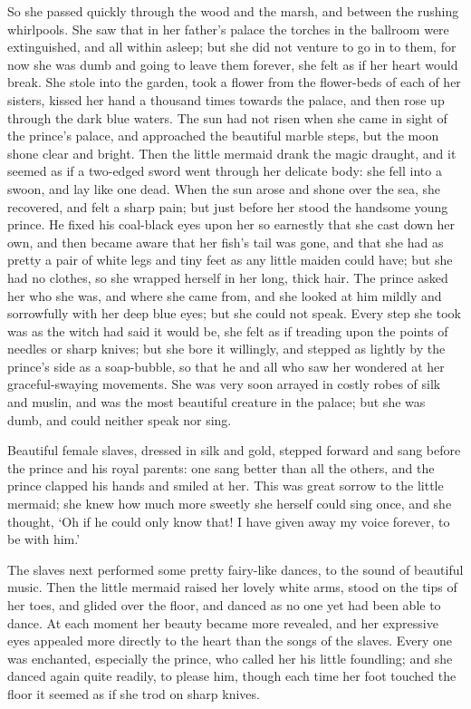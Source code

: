 So she passed quickly through the wood and the marsh, and between the rushing whirlpools.
She saw that in her father’s palace the torches in the ballroom were extinguished, and all within asleep; but she did not venture to go in to them, for now she was dumb and going to leave them forever, she felt as if her heart would break.
She stole into the garden, took a flower from the flower-beds of each of her sisters, kissed her hand a thousand times towards the palace, and then rose up through the dark blue waters.
The sun had not risen when she came in sight of the prince’s palace, and approached the beautiful marble steps, but the moon shone clear and bright.
Then the little mermaid drank the magic draught, and it seemed as if a two-edged sword went through her delicate body: she fell into a swoon, and lay like one dead.
When the sun arose and shone over the sea, she recovered, and felt a sharp pain; but just before her stood the handsome young prince.
He fixed his coal-black eyes upon her so earnestly that she cast down her own, and then became aware that her fish’s tail was gone, and that she had as pretty a pair of white legs and tiny feet as any little maiden could have; but she had no clothes, so she wrapped herself in her long, thick hair.
The prince asked her who she was, and where she came from, and she looked at him mildly and sorrowfully with her deep blue eyes; but she could not speak.
Every step she took was as the witch had said it would be, she felt as if treading upon the points of needles or sharp knives; but she bore it willingly, and stepped as lightly by the prince’s side as a soap-bubble, so that he and all who saw her wondered at her graceful-swaying movements.
She was very soon arrayed in costly robes of silk and muslin, and was the most beautiful creature in the palace; but she was dumb, and could neither speak nor sing.

Beautiful female slaves, dressed in silk and gold, stepped forward and sang before the prince and his royal parents: one sang better than all the others, and the prince clapped his hands and smiled at her.
This was great sorrow to the little mermaid; she knew how much more sweetly she herself could sing once, and she thought, `Oh if he could only know that! I have given away my voice forever, to be with him.'

The slaves next performed some pretty fairy-like dances, to the sound of beautiful music.
Then the little mermaid raised her lovely white arms, stood on the tips of her toes, and glided over the floor, and danced as no one yet had been able to dance.
At each moment her beauty became more revealed, and her expressive eyes appealed more directly to the heart than the songs of the slaves.
Every one was enchanted, especially the prince, who called her his little foundling; and she danced again quite readily, to please him, though each time her foot touched the floor it seemed as if she trod on sharp knives.

